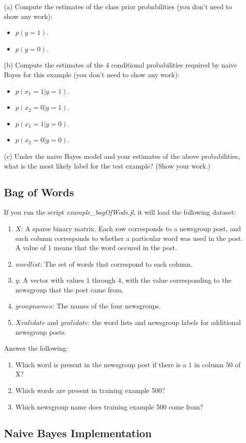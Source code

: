 \documentclass{article}
\def\blu#1{{\color{blu}#1}}
\def\items#1{\begin{itemize}#1\end{itemize}}
\def\enum#1{\begin{enumerate}#1\end{enumerate}}
\begin{document}
\blu{(a) Compute the estimates of the class prior probabilities} (you don't need to show any work):
\items{
\item$ p(y = 1)$.
\item $p(y = 0)$.
}

\blu{(b) Compute the estimates of the 4 conditional probabilities required by naive Bayes for this example}  (you don't need to show any work):
\items{
\item $p(x_1 = 1 | y = 1)$.
\item $p(x_2 = 0 | y = 1)$.
\item $p(x_1 = 1 | y = 0)$.
\item $p(x_2 = 0 | y = 0)$.
}

\blu{(c) Under the naive Bayes model and your estimates of the above probabilities, what is the most likely label for the test example? (Show your work.)}

\subsection{Bag of Words}

If you run the script \emph{example\_bagOfWods.jl}, it will load the following dataset:
\enum{
\item $X$: A sparse binary matrix. Each row corresponds to a newsgroup post, and each column corresponds to whether a particular word was used in the post. A value of $1$ means that the word occured in the post.
\item $wordlist$: The set of words that correspond to each column.
\item $y$: A vector with values $1$ through $4$, with the value corresponding to the newsgroup that the post came from.
\item $groupnames$: The names of the four newsgroups.
\item $Xvalidate$ and $yvalidate$: the word lists and newsgroup labels for additional newsgroup posts.
}
\blu{Answer the following}:
\enum{
\item Which word is present in the newsgroup post if there is a $1$ in column 50 of X?
\item Which words are present in training example 500?
\item Which newsgroup name does training example 500 come from?
}

\subsection{Naive Bayes Implementation}
\end{document}
